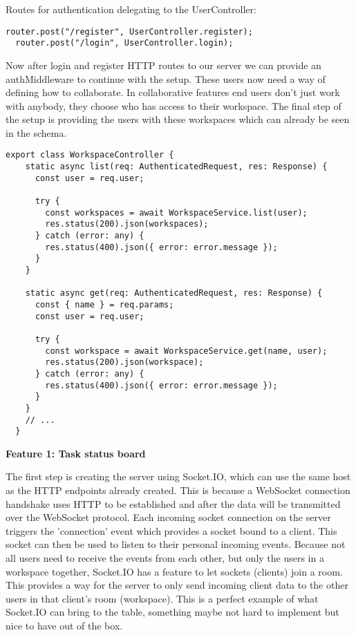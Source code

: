 Routes for authentication delegating to the UserController:

\begin{lstlisting}[caption=Authentication routes]
  router.post("/register", UserController.register);
  router.post("/login", UserController.login);
\end{lstlisting}

Now after login and register HTTP routes to our server we can provide an authMiddleware to continue with the setup. These users now need a way of defining how to collaborate. In collaborative features end users don't just work with anybody, they choose who has access to their workspace. The final step of the setup is providing the users with these workspaces which can already be seen in the schema.

\begin{lstlisting}[caption=WorkspaceController]
  export class WorkspaceController {
    static async list(req: AuthenticatedRequest, res: Response) {
      const user = req.user;
   
      try {
        const workspaces = await WorkspaceService.list(user);
        res.status(200).json(workspaces);
      } catch (error: any) {
        res.status(400).json({ error: error.message });
      }
    }
   
    static async get(req: AuthenticatedRequest, res: Response) {
      const { name } = req.params;
      const user = req.user;
   
      try {
        const workspace = await WorkspaceService.get(name, user);
        res.status(200).json(workspace);
      } catch (error: any) {
        res.status(400).json({ error: error.message });
      }
    }
    // ...
  }   
\end{lstlisting}

\textbf{Feature 1: Task status board}

The first step is creating the server using Socket.IO, which can use the same host as the HTTP endpoints already created. This is because a WebSocket connection handshake uses HTTP to be established and after the data will be transmitted over the WebSocket protocol. Each incoming socket connection on the server triggers the 'connection' event which provides a socket bound to a client. This socket can then be used to listen to their personal incoming events. Because not all users need to receive the events from each other, but only the users in a workspace together, Socket.IO has a feature to let sockets (clients) join a room. This provides a way for the server to only send incoming client data to the other users in that client's room (workspace). This is a perfect example of what Socket.IO can bring to the table, something maybe not hard to implement but nice to have out of the box.

